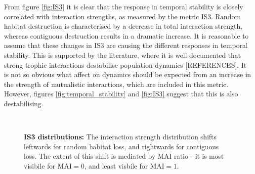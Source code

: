 From figure \ref{fig:IS3} it is clear that the response in temporal stability is closely correlated with interaction strengths, as measured by the metric IS3. Random habitat destruction is characterised by a decrease in total interaction strength, whereas contiguous destruction results in a dramatic increase. It is reasonable to assume that these changes in IS3 are causing the different responses in temporal stability. This is supported by the literature, where it is well documented that strong trophic interactions destabilise population dynamics [REFERENCES]. It is not so obvious what affect on dynamics should be expected from an increase in the strength of mutualistic interactions, which are included in this metric. However, figures \ref{fig:temporal_stability} and \ref{fig:IS3} suggest that this is also destabilising.

\begin{figure} 
		\centering      
        ~
        \caption{\textbf{IS3 distributions:} The interaction strength distribution shifts leftwards for random habitat loss, and rightwards for contiguous loss. The extent of this shift is mediated by MAI ratio - it is most visibile for MAI$=0$, and least visbile for MAI$=1$.}\label{fig:IS3_distributions}
\end{figure}

